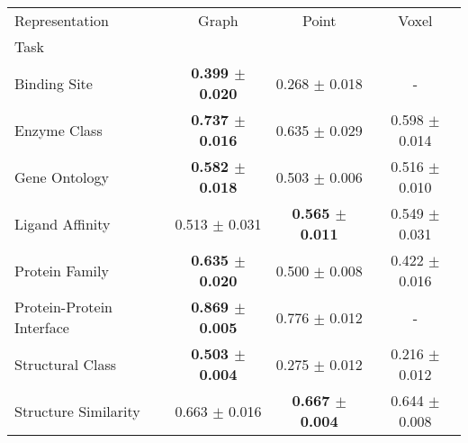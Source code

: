 \begin{tabular}{lccc}
\toprule
Representation & Graph & Point & Voxel \\
Task &  &  &  \\
\midrule
Binding Site & \textbf{0.399 $\pm$ 0.020} & 0.268 $\pm$ 0.018 & - \\
Enzyme Class & \textbf{0.737 $\pm$ 0.016} & 0.635 $\pm$ 0.029 & 0.598 $\pm$ 0.014 \\
Gene Ontology & \textbf{0.582 $\pm$ 0.018} & 0.503 $\pm$ 0.006 & 0.516 $\pm$ 0.010 \\
Ligand Affinity & 0.513 $\pm$ 0.031 & \textbf{0.565 $\pm$ 0.011} & 0.549 $\pm$ 0.031 \\
Protein Family & \textbf{0.635 $\pm$ 0.020} & 0.500 $\pm$ 0.008 & 0.422 $\pm$ 0.016 \\
Protein-Protein Interface & \textbf{0.869 $\pm$ 0.005} & 0.776 $\pm$ 0.012 & - \\
Structural Class & \textbf{0.503 $\pm$ 0.004} & 0.275 $\pm$ 0.012 & 0.216 $\pm$ 0.012 \\
Structure Similarity & 0.663 $\pm$ 0.016 & \textbf{0.667 $\pm$ 0.004} & 0.644 $\pm$ 0.008 \\
\bottomrule
\end{tabular}
